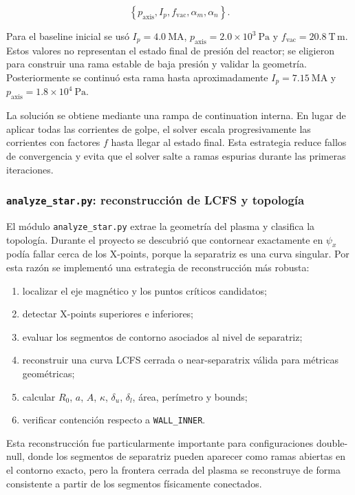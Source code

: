 \documentclass[11pt,a4paper]{article}
\begin{document}
\[
\left\{p_{\mathrm{axis}}, I_p, f_{\mathrm{vac}}, \alpha_m, \alpha_n\right\}.
\]

Para el baseline inicial se usó $I_p=4.0~\mathrm{MA}$, $p_{\mathrm{axis}}=2.0\times10^3~\mathrm{Pa}$
y $f_{\mathrm{vac}}=20.8~\mathrm{T\,m}$. Estos valores no representan el estado final de
presión del reactor; se eligieron para construir una rama estable de baja presión y validar la
geometría. Posteriormente se continuó esta rama hasta aproximadamente $I_p=7.15~\mathrm{MA}$ y
$p_{\mathrm{axis}}=1.8\times10^4~\mathrm{Pa}$.

La solución se obtiene mediante una rampa de continuation interna. En lugar de aplicar todas
las corrientes de golpe, el solver escala progresivamente las corrientes con factores $f$ hasta
llegar al estado final. Esta estrategia reduce fallos de convergencia y evita que el solver salte
a ramas espurias durante las primeras iteraciones.

\subsubsection{\texttt{analyze\_star.py}: reconstrucción de LCFS y topología}
El módulo \texttt{analyze\_star.py} extrae la geometría del plasma y clasifica la topología.
Durante el proyecto se descubrió que contornear exactamente en $\psi_x$ podía fallar cerca de
los X-points, porque la separatriz es una curva singular. Por esta razón se implementó una
estrategia de reconstrucción más robusta:

\begin{enumerate}
    \item localizar el eje magnético y los puntos críticos candidatos;
    \item detectar X-points superiores e inferiores;
    \item evaluar los segmentos de contorno asociados al nivel de separatriz;
    \item reconstruir una curva LCFS cerrada o near-separatrix válida para métricas geométricas;
    \item calcular $R_0$, $a$, $A$, $\kappa$, $\delta_u$, $\delta_l$, área, perímetro y bounds;
    \item verificar contención respecto a \texttt{WALL\_INNER}.
\end{enumerate}

Esta reconstrucción fue particularmente importante para configuraciones double-null, donde
los segmentos de separatriz pueden aparecer como ramas abiertas en el contorno exacto, pero
la frontera cerrada del plasma se reconstruye de forma consistente a partir de los segmentos
físicamente conectados.
\end{document}
